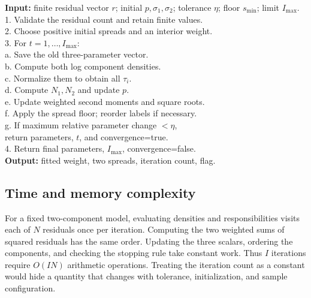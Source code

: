 \documentclass[conference,letterpaper]{IEEEtran}
\begin{document}
\begin{table}[t]
\caption{Pseudocode for the restricted EM fit}
\label{alg:em}
\centering
\begin{minipage}{.97\columnwidth}\small
\textbf{Input:} finite residual vector $r$; initial $p,\sigma_1,\sigma_2$; tolerance $\eta$; floor $s_{\min}$; limit $I_{\max}$.\\
1. Validate the residual count and retain finite values.\\
2. Choose positive initial spreads and an interior weight.\\
3. For $t=1,\ldots,I_{\max}$:\\
\hspace*{.8em}a. Save the old three-parameter vector.\\
\hspace*{.8em}b. Compute both log component densities.\\
\hspace*{.8em}c. Normalize them to obtain all $\tau_i$.\\
\hspace*{.8em}d. Compute $N_1,N_2$ and update $p$.\\
\hspace*{.8em}e. Update weighted second moments and square roots.\\
\hspace*{.8em}f. Apply the spread floor; reorder labels if necessary.\\
\hspace*{.8em}g. If maximum relative parameter change $<\eta$,\\
\hspace*{1.8em}return parameters, $t$, and convergence=true.\\
4. Return final parameters, $I_{\max}$, convergence=false.\\
\textbf{Output:} fitted weight, two spreads, iteration count, flag.
\end{minipage}
\end{table}

\subsection{Time and memory complexity}
For a fixed two-component model, evaluating densities and responsibilities visits each of $N$ residuals once per iteration. Computing the two weighted sums of squared residuals has the same order. Updating the three scalars, ordering the components, and checking the stopping rule take constant work. Thus $I$ iterations require $O(IN)$ arithmetic operations. Treating the iteration count as a constant would hide a quantity that changes with tolerance, initialization, and sample configuration.
\end{document}
